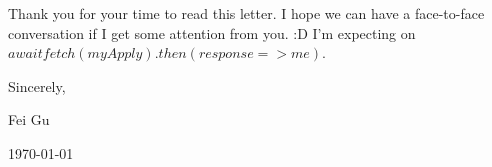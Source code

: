 \documentclass[a4paper]{article}
\begin{document}
\vspace{0.5em}
\hspace{1em}Thank you for your time to read this letter. I hope we can have a face-to-face conversation if I get some attention from you. :D I’m expecting on $await fetch( myApply ).then( response => me )$. 

\vspace{1em}

{\hfill Sincerely,} \par
{\hfill Fei Gu} \par
{\hfill \today} \par
\end{document}
